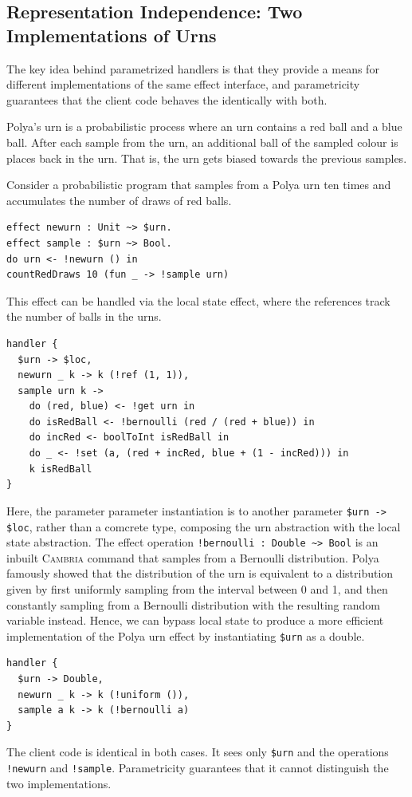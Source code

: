 \documentclass[acmsmall,screen,review,anonymous]{acmart}
\newcommand{\cambria}{\textsc{Cambria}}
\begin{document}
\subsection{Representation Independence: Two Implementations of Urns}\label{sec:polya}

The key idea behind parametrized handlers is that they provide a means for different implementations of the same effect interface,
and parametricity guarantees that the client code behaves the identically with both.

Polya's urn is a probabilistic process where an urn contains a red ball and a blue ball.
After each sample from the urn, an additional ball of the sampled colour is places back in the urn.
That is, the urn gets biased towards the previous samples.

Consider a probabilistic program that samples from a Polya urn ten times and accumulates the number of draws of red balls.
\begin{lstlisting}
effect newurn : Unit ~> $urn.
effect sample : $urn ~> Bool.
do urn <- !newurn () in
countRedDraws 10 (fun _ -> !sample urn) 
\end{lstlisting}
This effect can be handled via the local state effect, where the references track the number of balls in the urns.
\begin{lstlisting}
handler {
  $urn -> $loc,
  newurn _ k -> k (!ref (1, 1)),
  sample urn k ->
    do (red, blue) <- !get urn in
    do isRedBall <- !bernoulli (red / (red + blue)) in
    do incRed <- boolToInt isRedBall in
    do _ <- !set (a, (red + incRed, blue + (1 - incRed))) in
    k isRedBall
}
\end{lstlisting}
Here, the parameter parameter instantiation is to another parameter \lstinline|$urn -> $loc|, rather than a comcrete type,
composing the urn abstraction with the local state abstraction.
The effect operation \lstinline|!bernoulli : Double ~> Bool| is an inbuilt \cambria{} command that samples from a Bernoulli distribution.
Polya famously showed that the distribution of the urn is equivalent to a distribution given by first uniformly sampling from the interval
between 0 and 1, and then constantly sampling from a Bernoulli distribution with the resulting random variable instead.
Hence, we can bypass local state to produce a more efficient implementation of the Polya urn effect by instantiating \lstinline|$urn| as a double.
\begin{lstlisting}
handler {
  $urn -> Double,
  newurn _ k -> k (!uniform ()),
  sample a k -> k (!bernoulli a)
}
\end{lstlisting}
The client code is identical in both cases. It sees only \lstinline{$urn} and the operations \lstinline{!newurn} and \lstinline{!sample}.
Parametricity guarantees that it cannot distinguish the two implementations.
\end{document}
